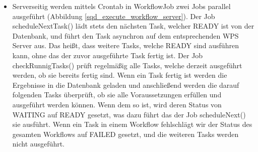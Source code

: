 \begin{itemize}
    \item Serverseitig werden mittels Crontab in WorkflowJob zwei Jobs parallel ausgeführt (Abbildung \ref{sqd_execute_workflow_server}). Der Job scheduleNextTask() lädt stets den nächsten Task, welcher \grqq{}READY\grqq{}  ist von der Datenbank, und führt den Task asynchron auf dem entsprechenden WPS Server aus. Das heißt, dass weitere Tasks, welche \grqq{}READY\grqq{}  sind ausführen kann, ohne das der zuvor ausgeführte Task fertig ist. 
    \newline
    Der Job checkRunnigTasks() prüft regelmäßig alle Tasks, welche derzeit ausgeführt werden, ob sie bereits fertig sind. Wenn ein Task fertig ist werden die Ergebnisse in die Datenbank geladen und anschließend werden die darauf folgenden Tasks überprüft, ob sie alle Voraussetzungen erfüllen und ausgeführt werden können. Wenn dem so ist, wird deren Status von \grqq{}WAITING\grqq{}  auf \grqq{}READY\grqq{}  gesetzt, was dazu führt das der Job scheduleNext() sie ausführt. Wenn ein Task in einem Workflow fehlschlägt wir der Status des gesamten Workflows auf \grqq{}FAILED\grqq{} gesetzt, und die weiteren Tasks werden nicht ausgeführt.



\end{itemize}
